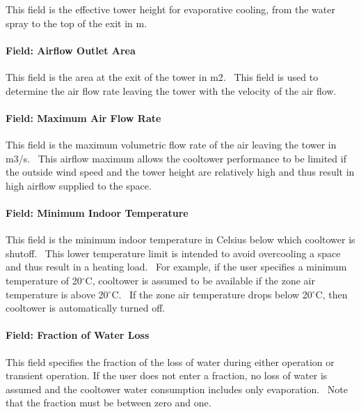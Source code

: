 This field is the effective tower height for evaporative cooling, from the water spray to the top of the exit in m.

\paragraph{Field: Airflow Outlet Area}\label{field-airflow-outlet-area}

This field is the area at the exit of the tower in m2. ~This field is used to determine the air flow rate leaving the tower with the velocity of the air flow.

\paragraph{Field: Maximum Air Flow Rate}\label{field-maximum-air-flow-rate-000}

This field is the maximum volumetric flow rate of the air leaving the tower in m3/s. ~This airflow maximum allows the cooltower performance to be limited if the outside wind speed and the tower height are relatively high and thus result in high airflow supplied to the space.

\paragraph{Field: Minimum Indoor Temperature}\label{field-minimum-indoor-temperature-2}

This field is the minimum indoor temperature in Celsius below which cooltower is shutoff. ~This lower temperature limit is intended to avoid overcooling a space and thus result in a heating load. ~For example, if the user specifies a minimum temperature of 20$^\circ$C, cooltower is assumed to be available if the zone air temperature is above 20$^\circ$C. ~If the zone air temperature drops below 20$^\circ$C, then cooltower is automatically turned off.

\paragraph{Field: Fraction of Water Loss}\label{field-fraction-of-water-loss}

This field specifies the fraction of the loss of water during either operation or transient operation. If the user does not enter a fraction, no loss of water is assumed and the cooltower water consumption includes only evaporation.~ Note that the fraction must be between zero and one.

